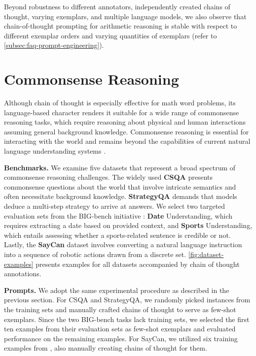 Beyond robustness to different annotators, independently created chains of thought, varying exemplars, and multiple language models, we also observe that chain-of-thought prompting for arithmetic reasoning is stable with respect to different exemplar orders and varying quantities of exemplars (refer to \cref{subsec:faq-prompt-engineering}).

\section{Commonsense Reasoning}\label{sec:commonsense-reasoning}

Although chain of thought is especially effective for math word problems, its language-based character renders it suitable for a wide range of commonsense reasoning tasks, which require reasoning about physical and human interactions assuming general background knowledge. Commonsense reasoning is essential for interacting with the world and remains beyond the capabilities of current natural language understanding systems \citep{talmor2022commonsenseqa}.

\textbf{Benchmarks.}
We examine five datasets that represent a broad spectrum of commonsense reasoning challenges. The widely used \textbf{CSQA} \citep{talmor-etal-2019-commonsenseqa} presents commonsense questions about the world that involve intricate semantics and often necessitate background knowledge. \textbf{StrategyQA} \citep{geva-etal-2021-aristotle} demands that models deduce a multi-step strategy to arrive at answers. We select two targeted evaluation sets from the BIG-bench initiative \citep{bigbench}: \textbf{Date} Understanding, which requires extracting a date based on provided context, and \textbf{Sports} Understanding, which entails assessing whether a sports-related sentence is credible or not. Lastly, the \textbf{SayCan} dataset \citep{ahn2022can} involves converting a natural language instruction into a sequence of robotic actions drawn from a discrete set. \cref{fig:dataset-examples} presents examples for all datasets accompanied by chain of thought annotations.

\textbf{Prompts.}
We adopt the same experimental procedure as described in the previous section. For CSQA and StrategyQA, we randomly picked instances from the training sets and manually crafted chains of thought to serve as few-shot exemplars. Since the two BIG-bench tasks lack training sets, we selected the first ten examples from their evaluation sets as few-shot exemplars and evaluated performance on the remaining examples. For SayCan, we utilized six training examples from \citet{ahn2022can}, also manually creating chains of thought for them.

